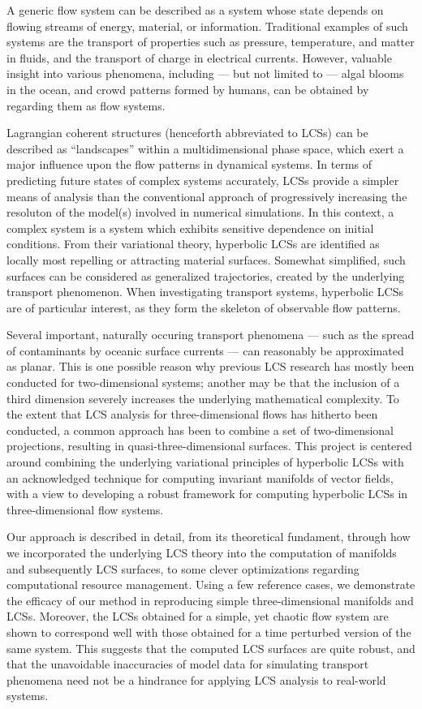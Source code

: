 \begingroup
\vspace{3mm}
A generic flow system can be described as a system whose state depends on
flowing streams of energy, material, or information. Traditional examples of
such systems are the transport of properties such as pressure, temperature, and
matter in fluids, and the transport of charge in electrical currents. However,
valuable insight into various phenomena, including --- but not limited to ---
algal blooms in the ocean, and crowd patterns formed by humans, can be obtained
by regarding them as flow systems.

Lagrangian coherent structures (henceforth abbreviated to LCSs) can be
described as ``landscapes'' within a multidimensional phase space, which exert
a major influence upon the flow patterns in dynamical systems. In terms of
predicting future states of complex systems accurately, LCSs provide a simpler
means of analysis than the conventional approach of progressively increasing
the resoluton of the model(s) involved in numerical simulations. In this
context, a complex system is a system which exhibits sensitive dependence on
initial conditions. From their variational theory, hyperbolic LCSs are
identified as locally most repelling or attracting material surfaces. Somewhat
simplified, such surfaces can be considered as generalized trajectories,
created by the underlying transport phenomenon. When investigating transport
systems, hyperbolic LCSs are of particular interest, as they form the skeleton
of observable flow patterns.

Several important, naturally occuring transport phenomena --- such as the
spread of contaminants by oceanic surface currents --- can reasonably be
approximated as planar. This is one possible reason why previous
LCS research has mostly been conducted for two-dimensional systems; another may
be that the inclusion of a third dimension severely increases the underlying
mathematical complexity. To the extent that LCS analysis for three-dimensional
flows has hitherto been conducted, a common approach has been to combine a set
of two-dimensional projections, resulting in quasi-three-dimensional
surfaces. This project is centered around combining the underlying variational
principles of hyperbolic LCSs with an acknowledged technique for computing
invariant manifolds of vector fields, with a view to developing a robust
framework for computing hyperbolic LCSs in three-dimensional flow systems.

Our approach is described in detail, from its theoretical fundament, through
how we incorporated the underlying LCS theory into the computation of manifolds
and subsequently LCS surfaces, to some clever optimizations regarding
computational resource management. Using a few reference cases, we demonstrate
the efficacy of our method in reproducing simple three-dimensional manifolds
and LCSs. Moreover, the LCSs obtained for a simple, yet chaotic flow
system are shown to correspond well with those obtained for a time perturbed
version of the same system. This suggests that the computed LCS surfaces are
quite robust, and that the unavoidable inaccuracies of model data for
simulating transport phenomena need not be a hindrance for applying LCS
analysis to real-world systems.

